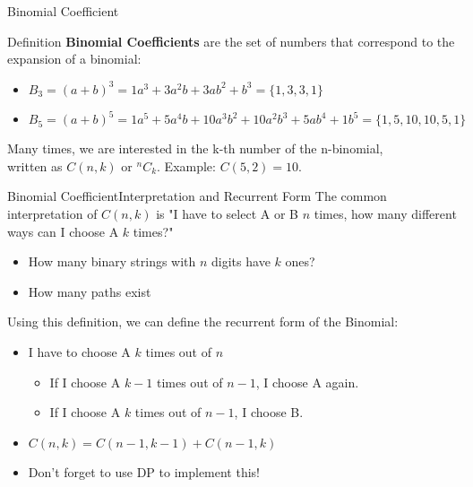 
\begin{frame}{Binomial Coefficient}
  \begin{block}{Definition}
    {\bf Binomial Coefficients} are the set of numbers that correspond to the expansion of a binomial:\bigskip

    \begin{itemize}
      \item $B_3 = (a+b)^3 = 1a^3 + 3a^2b + 3ab^2 + b^3 = \{1,3,3,1\}$
      \item $B_5 = (a+b)^5 = 1a^5 + 5a^4b + 10a^3b^2 + 10a^2b^3 + 5ab^4 + 1b^5 = \{1,5,10,10,5,1\}$
    \end{itemize}\bigskip

    Many times, we are interested in the k-th number of the n-binomial,\\ written as $C(n,k)$ or $^nC_k$. Example: $C(5,2) = 10$.
  \end{block}
\end{frame}

\begin{frame}[fragile]{Binomial Coefficient}{Interpretation and Recurrent Form}
  The common interpretation of $C(n,k)$ is "I have to select A or B $n$ times, how many different ways can I choose A $k$ times?"
  \begin{itemize}
    \item How many binary strings with $n$ digits have $k$ ones?
    \item How many paths exist
  \end{itemize}\bigskip

  Using this definition, we can define the recurrent form of the Binomial:
  \begin{itemize}
    \item I have to choose A $k$ times out of $n$
    \begin{itemize}
      \item If I choose A $k-1$ times out of $n-1$, I choose A again.
      \item If I choose A $k$ times out of $n-1$, I choose B.
    \end{itemize}
    \item $C(n,k) = C(n-1,k-1) + C(n-1,k)$
    \item Don't forget to use DP to implement this!
  \end{itemize}\bigskip
\end{frame}

